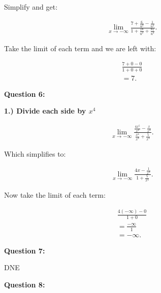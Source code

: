 \documentclass{report}
\begin{document}
    \bigbreak \noindent 
    Simplify and get:

    \begin{align*}
        \lim\limits_{x \to - \infty}{ \frac{7 + \frac{6}{u^2} - \frac{1}{u^4}}{1 + \frac{18}{u^2} + \frac{81}{u^4}}}
    .\end{align*}

    \bigbreak \noindent 
    Take the limit of each term and we are left with:

    \begin{align*}
        \frac{7+0-0}{1+0+0} \\ 
        = 7
    .\end{align*}

    \bigbreak \noindent \bigbreak \noindent 
    \begin{Large}
        \textbf{Question 6:}
    \end{Large}

    \pagebreak \bigbreak \noindent
    \bigbreak \noindent 
    \textbf{1.) Divide each side by $x^4$}

    \begin{align*}
        \lim\limits_{x \to - \infty}{ \frac{ \frac{4x^5}{x^4} - \frac{x}{x^4}}{ \frac{x^4}{x^4} + \frac{5}{x^4}}}
    .\end{align*}

    \bigbreak \noindent 
    Which simplifies to:

    \begin{align*}
        \lim\limits_{x \to - \infty}{ \frac{4x - \frac{1}{x^3}}{1+ \frac{5}{x^4}}}
    .\end{align*}

    \bigbreak \noindent 
    Now take the limit of each term:

    \begin{align*}
        \frac{4 \left(- \infty\right) - 0}{1 + 0} \\
        = \frac{- \infty}{1} \\ 
        = - \infty
    .\end{align*}

    \bigbreak \noindent \bigbreak \noindent 
    \begin{Large}
        \textbf{Question 7:}
    \end{Large}

    \bigbreak \noindent  \bigbreak \noindent 
    \bigbreak \noindent 
    DNE

     \bigbreak \noindent \bigbreak \noindent 
    \begin{Large}
        \textbf{Question 8:}
    \end{Large}
\end{document}
